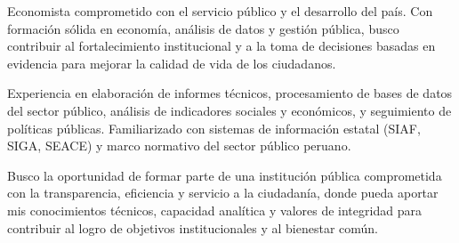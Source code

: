 \par{

	Economista comprometido con el servicio público y el desarrollo del país. Con formación sólida en economía, análisis de datos y gestión pública, busco contribuir al fortalecimiento institucional y a la toma de decisiones basadas en evidencia para mejorar la calidad de vida de los ciudadanos.

	Experiencia en elaboración de informes técnicos, procesamiento de bases de datos del sector público, análisis de indicadores sociales y económicos, y seguimiento de políticas públicas. Familiarizado con sistemas de información estatal (SIAF, SIGA, SEACE) y marco normativo del sector público peruano.

	Busco la oportunidad de formar parte de una institución pública comprometida con la transparencia, eficiencia y servicio a la ciudadanía, donde pueda aportar mis conocimientos técnicos, capacidad analítica y valores de integridad para contribuir al logro de objetivos institucionales y al bienestar común.





}
